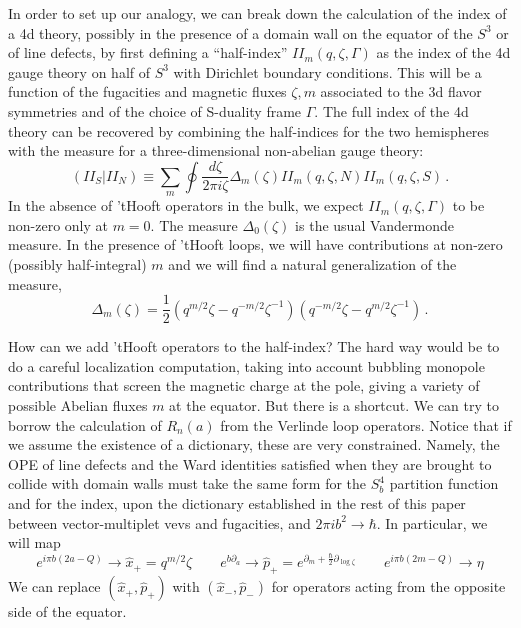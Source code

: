 \documentclass[11pt,letterpaper]{article}
\numberwithin{equation}{section}
\begin{document}
In order to set up our analogy, we can break down the calculation of the index of a 4d theory, possibly in the presence of a domain wall
on the equator of the $S^3$ or of line defects, by first defining a ``half-index'' $I\!I_m(q,\zeta,\Gamma)$ as the index of the 4d gauge theory on half of $S^3$ with Dirichlet boundary conditions.
This will be a function of the fugacities and magnetic fluxes $\zeta,m$ associated to the
3d flavor symmetries and of the choice of S-duality frame $\Gamma$.
The full index of the 4d theory can be recovered by combining the half-indices for the two hemispheres with the measure for
a three-dimensional non-abelian gauge theory:
\begin{equation}
\left( I\!I_S | I\!I_N \right) \equiv \sum_m \oint \frac{d\zeta}{2\pi i\zeta} \Delta_m(\zeta) I\!I_m(q,\zeta,N) I\!I_m(q,\zeta,S)\,.
\end{equation}
In the absence of 'tHooft operators in the bulk, we expect $I\!I_m(q,\zeta,\Gamma)$ to be non-zero only at $m=0$.
The measure $\Delta_0(\zeta)$ is the usual Vandermonde measure.
In the presence of 'tHooft loops, we will have contributions at
 non-zero (possibly half-integral) $m$ and  we will find a natural generalization of the measure,
\begin{equation}
\Delta_m(\zeta)= \frac{1}{2} (q^{m/2} \zeta-q^{-m/2} \zeta^{-1})(q^{-m/2} \zeta-q^{m/2} \zeta^{-1})\,.
\end{equation}

How can we add 'tHooft operators to the half-index? The hard way would be to do a careful localization computation, taking into account bubbling monopole contributions
that screen the magnetic charge at the pole, giving a variety of possible Abelian fluxes $m$ at the equator. But there is a shortcut. We can try to borrow the calculation of $R_n(a)$
from the Verlinde loop operators. Notice that if we assume the existence of a dictionary, these are very constrained. Namely, the OPE of line defects and the Ward identities satisfied when they are brought to
collide with domain walls must take the same form for the  $S^4_b$ partition function and for the index, upon the dictionary  established in the rest of this paper between vector-multiplet vevs and fugacities, and
 $2 \pi i b^2 \to \hbar$. In particular, we will map
 \begin{equation} \label{opdict}
 e^{i \pi b (2a-Q)} \to \hat x_+ = q^{m/2} \zeta  \qquad  e^{b \partial_a} \to \hat p_+ = e^{\partial_m + \frac{\hbar}{2} \partial_{\log \zeta}} \qquad  e^{i \pi b (2m-Q)} \to \eta
 \end{equation}
 We can replace $(\hat x_+,\hat p_+)$ with $(\hat x_-,\hat p_-)$ for operators acting from the opposite side of the equator.
\end{document}
